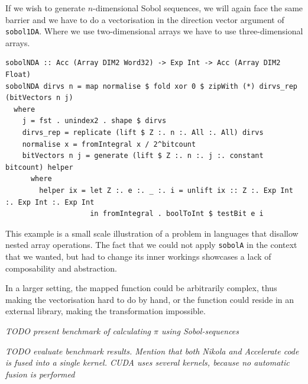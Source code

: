 \documentclass[preprint]{sigplanconf}
\begin{document}
If we wish to generate $n$-dimensional Sobol sequences, we will again
face the same barrier and we have to do a vectorisation in the
direction vector argument of \verb|sobol1DA|. Where we use
two-dimensional arrays we have to use three-dimensional arrays. %

\begin{verbatim}
sobolNDA :: Acc (Array DIM2 Word32) -> Exp Int -> Acc (Array DIM2 Float)
sobolNDA dirvs n = map normalise $ fold xor 0 $ zipWith (*) dirvs_rep (bitVectors n j)
  where
    j = fst . unindex2 . shape $ dirvs
    dirvs_rep = replicate (lift $ Z :. n :. All :. All) dirvs
    normalise x = fromIntegral x / 2^bitcount
    bitVectors n j = generate (lift $ Z :. n :. j :. constant bitcount) helper
      where
        helper ix = let Z :. e :. _ :. i = unlift ix :: Z :. Exp Int :. Exp Int :. Exp Int
                    in fromIntegral . boolToInt $ testBit e i
\end{verbatim}

This example is a small scale illustration of a problem in languages
that disallow nested array operations. The fact that we could not
apply \verb|sobolA| in the context that we wanted, but had to change
its inner workings showcases a lack of composability and abstraction. %

In a larger setting, the mapped function could be arbitrarily complex,
thus making the vectorisation hard to do by hand, or the function could
reside in an external library, making the transformation impossible.


\emph{TODO present benchmark of calculating $\pi$ using Sobol-sequences}

\emph{TODO evaluate benchmark results. Mention that both Nikola and
  Accelerate code is fused into a single kernel. CUDA uses several
  kernels, because no automatic fusion is performed}

\end{document}
